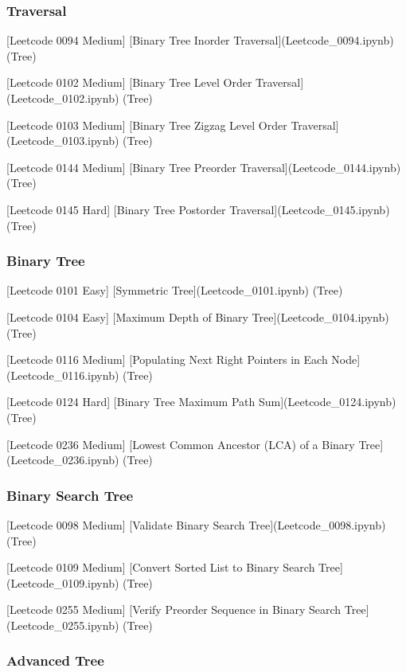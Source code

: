 \documentclass[11pt]{article}
\begin{document}
    \subsubsection{Traversal}\label{traversal}

{[}Leetcode 0094 Medium{]} {[}Binary Tree Inorder
Traversal{]}(Leetcode\_0094.ipynb) (Tree)

{[}Leetcode 0102 Medium{]} {[}Binary Tree Level Order
Traversal{]}(Leetcode\_0102.ipynb) (Tree)

{[}Leetcode 0103 Medium{]} {[}Binary Tree Zigzag Level Order
Traversal{]}(Leetcode\_0103.ipynb) (Tree)

{[}Leetcode 0144 Medium{]} {[}Binary Tree Preorder
Traversal{]}(Leetcode\_0144.ipynb) (Tree)

{[}Leetcode 0145 Hard{]} {[}Binary Tree Postorder
Traversal{]}(Leetcode\_0145.ipynb) (Tree)

\subsubsection{Binary Tree}\label{binary-tree}

{[}Leetcode 0101 Easy{]} {[}Symmetric Tree{]}(Leetcode\_0101.ipynb)
(Tree)

{[}Leetcode 0104 Easy{]} {[}Maximum Depth of Binary
Tree{]}(Leetcode\_0104.ipynb) (Tree)

{[}Leetcode 0116 Medium{]} {[}Populating Next Right Pointers in Each
Node{]}(Leetcode\_0116.ipynb) (Tree)

{[}Leetcode 0124 Hard{]} {[}Binary Tree Maximum Path
Sum{]}(Leetcode\_0124.ipynb) (Tree)

{[}Leetcode 0236 Medium{]} {[}Lowest Common Ancestor (LCA) of a Binary
Tree{]}(Leetcode\_0236.ipynb) (Tree)

\subsubsection{Binary Search Tree}\label{binary-search-tree}

{[}Leetcode 0098 Medium{]} {[}Validate Binary Search
Tree{]}(Leetcode\_0098.ipynb) (Tree)

{[}Leetcode 0109 Medium{]} {[}Convert Sorted List to Binary Search
Tree{]}(Leetcode\_0109.ipynb) (Tree)

{[}Leetcode 0255 Medium{]} {[}Verify Preorder Sequence in Binary Search
Tree{]}(Leetcode\_0255.ipynb) (Tree)

\subsubsection{Advanced Tree}\label{advanced-tree}
\end{document}
